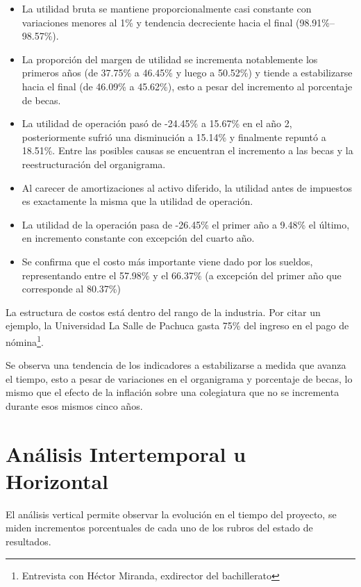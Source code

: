 \begin{itemize}
	\item La utilidad bruta se mantiene proporcionalmente casi constante con variaciones menores al 1\% y tendencia decreciente hacia el final (98.91\%--98.57\%).
	\item La proporción del margen de utilidad se incrementa notablemente los primeros años (de 37.75\% a 46.45\% y luego a 50.52\%) y tiende a estabilizarse hacia el final (de 46.09\% a 45.62\%), esto a pesar del incremento al porcentaje de becas.
	\item La utilidad de operación pasó de -24.45\% a 15.67\% en el año 2, posteriormente sufrió una disminución a 15.14\% y finalmente repuntó a 18.51\%. Entre las posibles causas se encuentran el incremento a las becas y la reestructuración del organigrama.
	\item Al carecer de amortizaciones al activo diferido, la utilidad antes de impuestos es exactamente la misma que la utilidad de operación.
	\item La utilidad de la operación pasa de -26.45\% el primer año a 9.48\% el último, en incremento constante con excepción del cuarto año.
	\item Se confirma que el costo más importante viene dado por los sueldos, representando entre el 57.98\% y el 66.37\% (a excepción del primer año que corresponde al 80.37\%)
\end{itemize}

La estructura de costos está dentro del rango de la industria. Por citar un ejemplo, la Universidad La Salle de Pachuca gasta 75\% del ingreso en el pago de nómina\footnote{Entrevista con Héctor Miranda, exdirector del bachillerato}.

Se observa una tendencia de los indicadores a estabilizarse a medida que avanza el tiempo, esto a pesar de variaciones en el organigrama y porcentaje de becas, lo mismo que el efecto de la inflación sobre una colegiatura que no se incrementa durante esos mismos cinco años.





\section{Análisis Intertemporal u Horizontal}
\label{sec:AnalisisHorizontal}

El análisis vertical permite observar la evolución en el tiempo del proyecto, se miden incrementos porcentuales de cada uno de los rubros del estado de resultados.

